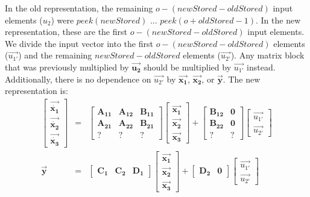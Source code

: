     In the old representation, the remaining $o-(newStored-oldStored)$ input elements
($u_2$) were $peek(newStored)$ ... $peek(o+oldStored-1)$. In the
new representation, these are the first $o-(newStored-oldStored)$
input elements. We divide the input vector into the first
$o-(newStored-oldStored)$ elements ($\vec{u_{1'}}$) and the
remaining $newStored-oldStored$ elements ($\vec{u_{2'}}$). Any
matrix block that was previously multiplied by
$\vec{\mathbf{u_2}}$ should be multiplied by $\vec{u_{1'}}$
instead. Additionally, there is no dependence on $\vec{u_{2'}}$ by
$\vec{\mathbf{x_1}}$, $\vec{\mathbf{x_2}}$, or $\vec{\mathbf{y}}$.
The new representation is:
\begin{eqnarray*}
\left [ \begin{array} {c} \vec{\dot{\mathbf{x_1}}} \\ \vec{\dot{\mathbf{x_2}}} \\
\vec{\dot{\mathbf{x_3}}} \end{array} \right ] & = & \left [
\begin{array} {ccc} \mathbf{A_{11}} & \mathbf{A_{12}} &
\mathbf{B_{11}} \\ \mathbf{A_{21}} & \mathbf{A_{22}} &
\mathbf{B_{21}} \\ ? & ? & ? \end{array} \right ] \left [
\begin{array} {c} \vec{\mathbf{x_1}} \\ \vec{\mathbf{x_2}} \\ \vec{\mathbf{x_3}} \end{array} \right ]
+ \left [ \begin{array} {cc} \mathbf{B_{12}} & \mathbf{0} \\
\mathbf{B_{22}} & \mathbf{0} \\ ? & ? \end{array} \right ] \left[
\begin{array} {c} \vec{u_{1'}} \\ \vec{u_{2'}} \end{array} \right ] \\
\vec{\mathbf{y}} & = & \left [ \begin{array} {ccc} \mathbf{C_1} &
\mathbf{C_2} & \mathbf{D_1} \end{array} \right ] \left [
\begin{array} {c} \vec{\mathbf{x_1}} \\ \vec{\mathbf{x_2}} \\ \vec{\mathbf{x_3}} \end{array} \right ] +
\left [ \begin{array} {cc} \mathbf{D_2} & \mathbf{0}
\end{array} \right ] \left [ \begin{array} {c} \vec{u_{1'}} \\
\vec{u_{2'}} \end{array} \right ]
\end{eqnarray*}

